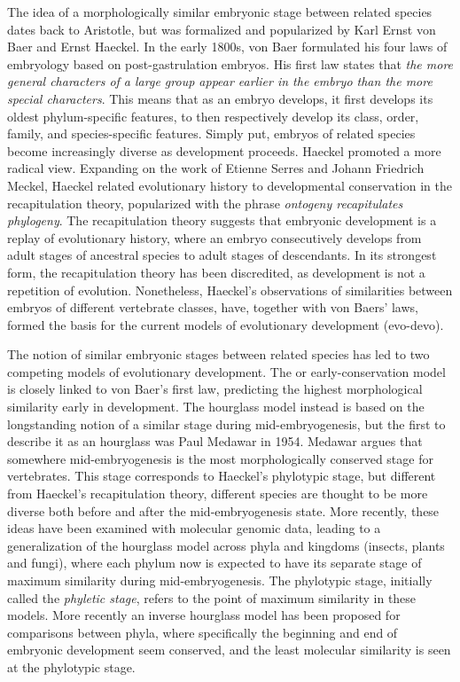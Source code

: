 The idea of a morphologically similar embryonic stage between related species dates back to Aristotle\cite{Aristotle1943}, but was formalized and popularized by Karl Ernst von Baer and Ernst Haeckel\cite{haeckel1866,baer1828}. In the early 1800s, von Baer formulated his four laws of embryology based on post-gastrulation embryos. His first law states that \textit{the more general characters of a large group appear earlier in the embryo than the more special characters}. This means that as an embryo develops, it first develops its oldest phylum-specific features, to then respectively develop its class, order, family, and species-specific features. Simply put, embryos of related species become increasingly diverse as development proceeds. Haeckel promoted a more radical view. Expanding on the work of Etienne Serres and Johann Friedrich Meckel, Haeckel related evolutionary history to developmental conservation in the recapitulation theory, popularized with the phrase \textit{ontogeny recapitulates phylogeny}. The recapitulation theory suggests that embryonic development is a replay of evolutionary history, where an embryo consecutively develops from adult stages of ancestral species to adult stages of descendants. In its strongest form, the recapitulation theory has been discredited, as development is not a repetition of evolution\cite{ehrlich1974}. Nonetheless, Haeckel's observations of similarities between embryos of different vertebrate classes, have, together with von Baers’ laws, formed the basis for the current models of evolutionary development (evo-devo).

The notion of similar embryonic stages between related species has led to two competing models of evolutionary development. The  or early-conservation model is closely linked to von Baer's first law, predicting the highest morphological similarity early in development. The hourglass model instead is based on the longstanding notion of a similar stage during mid-embryogenesis\cite{His1875}, but the first to describe it as an hourglass was Paul Medawar in 1954\cite{Medawar1954}. Medawar argues that somewhere mid-embryogenesis is the most morphologically conserved stage for vertebrates. This stage corresponds to Haeckel's phylotypic stage, but different from Haeckel's recapitulation theory, different species are thought to be more diverse both before and after the mid-embryogenesis state. More recently, these ideas have been examined with molecular genomic data, leading to a generalization of the hourglass model across phyla and kingdoms (insects\cite{Kalinka2010}, plants\cite{Quint2012} and fungi\cite{Cheng2015}), where each phylum now is expected to have its separate stage of maximum similarity during mid-embryogenesis. The phylotypic stage, initially called the \textit{phyletic stage}, refers to the point of maximum similarity in these models\cite{Cohen1963, Seidel1960}. More recently an inverse hourglass model has been proposed for comparisons between phyla, where specifically the beginning and end of embryonic development seem conserved, and the least molecular similarity is seen at the phylotypic stage\cite{Levin2016}.

